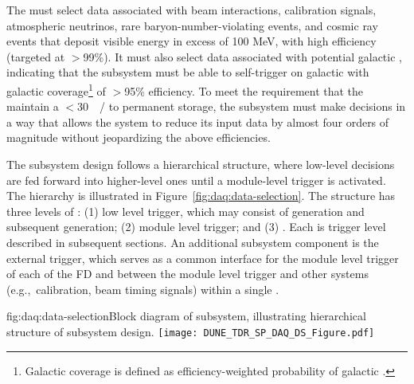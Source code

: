 The  must select data associated with beam interactions,
calibration signals, atmospheric neutrinos, rare baryon-number-violating events, and cosmic ray events that deposit visible energy in excess of 100 MeV, with high efficiency (targeted at $>$99\%). 
It must also select data associated with potential galactic , indicating that the  subsystem must be able to self-trigger on galactic  with galactic coverage\footnote{Galactic coverage is defined as efficiency-weighted probability of galactic .} of $>$95\% efficiency.
To meet the requirement that the   maintain a
$<$\SI{30}{\peta\byte/\year} to permanent storage, the 
subsystem must make  decisions in a way that allows the  
system to reduce its input data by almost four orders of magnitude
without jeopardizing the above efficiencies.

The  subsystem design follows a hierarchical structure, where low-level
decisions are fed forward into higher-level ones until a  module-level trigger is activated. The hierarchy
is illustrated in Figure~\ref{fig:daq:data-selection}. The structure
has three levels of : (1) low level trigger, which may consist of
 generation and subsequent
 generation; (2) module level trigger; and (3) . Each is trigger level described in subsequent
sections. An additional subsystem component is the external trigger,
which serves as a common interface for the
module level trigger of each of the FD  and between
the module level trigger and other systems (e.g.,~calibration, beam
timing signals) within a single .

\begin{dunefigure}{fig:daq:data-selection}{Block diagram of  
     subsystem, illustrating hierarchical structure of
    subsystem design.}
  \texttt{[image: DUNE\_TDR\_SP\_DAQ\_DS\_Figure.pdf]}
\end{dunefigure}

